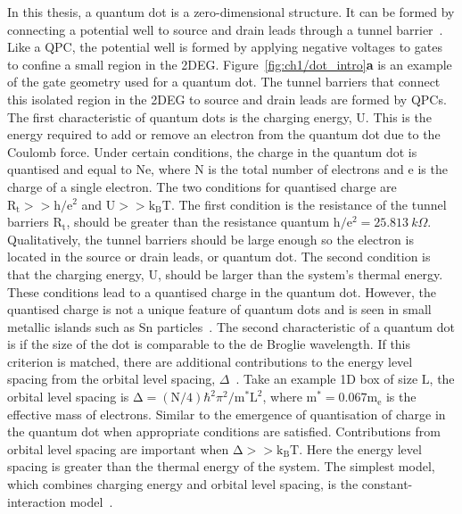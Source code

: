 In this thesis, a quantum dot is a zero-dimensional structure. It can be formed by connecting a potential well to source and drain leads through a tunnel barrier~\cite{spins_in_qd}. Like a QPC, the potential well is formed by applying negative voltages to gates to confine a small region in the 2DEG. Figure~\ref{fig:ch1/dot_intro}\textbf{a} is an example of the gate geometry used for a quantum dot. The tunnel barriers that connect this isolated region in the 2DEG to source and drain leads are formed by QPCs. The first characteristic of quantum dots is the charging energy, $\mathrm{U}$. This is the energy required to add or remove an electron from the quantum dot due to the Coulomb force. 
Under certain conditions, the charge in the quantum dot is quantised and equal to $\mathrm{Ne}$, where $\mathrm{N}$ is the total number of electrons and $\mathrm{e}$ is the charge of a single electron. The two conditions for quantised charge are $\mathrm{R_t}>>\mathrm{h/e^2}$ and $\mathrm{U}>>\mathrm{k_BT}$. The first condition is the resistance of the tunnel barriers $\mathrm{R_t}$, should be greater than the resistance quantum $\mathrm{h/e^2}=\qty{25.813}{k\Omega}$. Qualitatively, the tunnel barriers should be large enough so the electron is located in the source or drain leads, or quantum dot. The second condition is that the charging energy, $\mathrm{U}$, should be larger than the system's thermal energy. These conditions lead to a quantised charge in the quantum dot. However, the quantised charge is not a unique feature of quantum dots and is seen in small metallic islands such as Sn particles~\cite{first_quantised_charge}.
The second characteristic of a quantum dot is if the size of the dot is comparable to the de Broglie wavelength. If this criterion is matched, there are additional contributions to the energy level spacing from the orbital level spacing, $\Delta$~\cite{Kouwenhoven_1997_electron_transport}. Take an example 1D box of size $\mathrm{L}$, the orbital level spacing is $\mathrm{\Delta}=(\mathrm{N}/4)\hbar^2\pi^2 / \mathrm{m^*L^2}$, where $\mathrm{m^*}=0.067\mathrm{m_e}$ is the effective mass of electrons. Similar to the emergence of quantisation of charge in the quantum dot when appropriate conditions are satisfied. Contributions from orbital level spacing are important when $\mathrm{\Delta}>>\mathrm{k_BT}$. Here the energy level spacing is greater than the thermal energy of the system. The simplest model, which combines charging energy and orbital level spacing, is the constant-interaction model~\cite{Beenakker1991_constant_interaction}.

